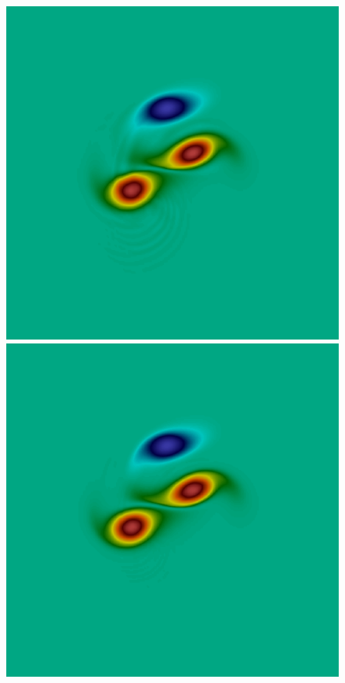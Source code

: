 \begin{figure}[t]
\centering
\includegraphics[scale=0.06]{data/Incompressible_Euler/Snapshots/red_17_2.png}\hspace{1em}
\includegraphics[scale=0.06]{data/Incompressible_Euler/Snapshots/red_35_2.png}\hspace{1em}

\end{figure}
